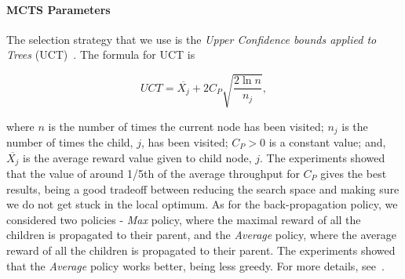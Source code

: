 \documentclass[smallextended]{svjour3}
\begin{document}
\paragraph{MCTS Parameters} The selection strategy that we use is the \emph{Upper Confidence bounds applied to Trees} (UCT)~\cite{kocsis2006improved}.
The formula for UCT is

$$UCT= \overline{X_j} + 2C_P\sqrt{\frac{2\ln n}{n_j}},$$

\noindent
where $n$ is the number of times the current node has been visited; $n_j$ is the number of times the child, $j$, has been visited;
$C_P>0$ is a constant value; and, $\overline{X_j}$ is the average
reward value given to child node, $j$. The experiments showed that the
value of around 1/5th of the average throughput for $C_P$ gives the
best results, being a good tradeoff between reducing the search space
and making sure we do not get stuck in the local optimum. As for the back-propagation
policy, we considered two policies - \emph{Max} policy, where the
maximal reward of all the children is propagated to their parent, and
the \emph{Average} policy, where the average reward of all the
children is propagated to their parent. The experiments showed that
the \emph{Average} policy works better, being less greedy. For more
details, see~\cite{cec}.








\end{document}
